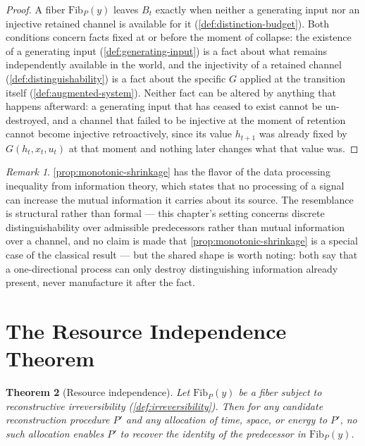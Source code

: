 \documentclass[11pt]{book}
\theoremstyle{plain}
\newtheorem{theorem}{Theorem}[chapter]
\theoremstyle{definition}
\theoremstyle{remark}
\newtheorem{remark}[theorem]{Remark}
\begin{document}
\begin{proof}
A fiber $\mathrm{Fib}_P(y)$ leaves $B_t$ exactly when neither a
generating input nor an injective retained channel is available for it
(\cref{def:distinction-budget}). Both conditions concern facts fixed at
or before the moment of collapse: the existence of a generating input
(\cref{def:generating-input}) is a fact about what remains
independently available in the world, and the injectivity of a
retained channel (\cref{def:distinguishability}) is a fact about the
specific $G$ applied at the transition itself
(\cref{def:augmented-system}). Neither fact can be altered by anything
that happens afterward: a generating input that has ceased to exist
cannot be un-destroyed, and a channel that failed to be injective at
the moment of retention cannot become injective retroactively, since
its value $h_{t+1}$ was already fixed by $G(h_t, x_t, u_t)$ at that
moment and nothing later changes what that value was.
\end{proof}

\begin{remark}
\cref{prop:monotonic-shrinkage} has the flavor of the data processing
inequality from information theory, which states that no processing
of a signal can increase the mutual information it carries about its
source. The resemblance is structural rather than formal --- this
chapter's setting concerns discrete distinguishability over
admissible predecessors rather than mutual information over a
channel, and no claim is made that \cref{prop:monotonic-shrinkage} is
a special case of the classical result --- but the shared shape is
worth noting: both say that a one-directional process can only destroy
distinguishing information already present, never manufacture it
after the fact.
\end{remark}

\section{The Resource Independence Theorem}

\begin{theorem}[Resource independence]
\label{thm:resource-independence}
Let $\mathrm{Fib}_P(y)$ be a fiber subject to reconstructive
irreversibility (\cref{def:irreversibility}). Then for any candidate
reconstruction procedure $P'$ and any allocation of time, space, or
energy to $P'$, no such allocation enables $P'$ to recover the
identity of the predecessor in $\mathrm{Fib}_P(y)$.
\end{theorem}
\end{document}
